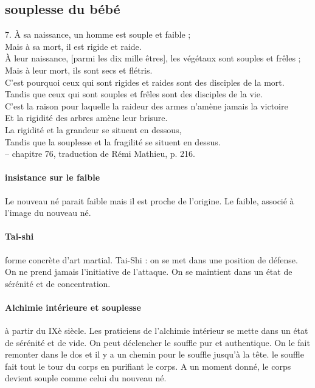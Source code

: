 \subsection{souplesse du bébé}
\begin{singlequote}
    7.	À sa naissance, un homme est souple et faible ; \\Mais à sa mort, il est rigide et raide.\\
À leur naissance, [parmi les dix mille êtres], les végétaux sont souples et frêles ; \\Mais à leur mort, ils sont secs et flétris.\\
C’est pourquoi ceux qui sont rigides et raides sont des disciples de la mort. \\Tandis que ceux qui sont souples et frêles sont des disciples de la vie.\\
C’est la raison pour laquelle la raideur des armes n’amène jamais la victoire \\Et la rigidité des arbres amène leur brisure.\\
La rigidité et la grandeur se situent en dessous,\\
Tandis que la souplesse et la fragilité se situent en dessus.\\
-- chapitre 76, traduction de Rémi Mathieu, p. 216.
\end{singlequote}

\paragraph{insistance sur le faible} Le nouveau né parait faible mais il est proche de l'origine. Le faible, associé à l'image du nouveau né.

\paragraph{Tai-shi} forme concrète d'art martial. Tai-Shi : on se met dans une position de défense. On ne prend jamais l'initiative de l'attaque. On se maintient dans un état de sérénité et de concentration. 

\paragraph{Alchimie intérieure et souplesse} à partir du IXè siècle. Les praticiens de l'alchimie intérieur se mette dans un état de sérénité et de vide. On peut déclencher le souffle pur et authentique. On le fait remonter dans le dos et il y a un chemin pour le souffle jusqu'à la tête. le souffle fait tout le tour du corps en purifiant le corps. A un moment donné, le corps devient souple comme celui du nouveau né.


